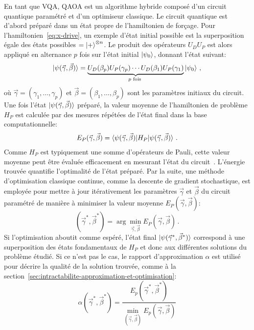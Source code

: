 En tant que VQA, QAOA est un algorithme hybride composé d'un circuit quantique paramétré et d'un optimiseur classique. Le circuit quantique est d'abord préparé dans un état propre de l'hamiltonien de forçage. Pour l'hamiltonien~\ref{eq:x-drive}, un exemple d'état initial possible est la superposition égale des états possibles $= \ket{+}^{\otimes n}$. Le produit des opérateurs $U_{D}U_{P}$ est alors appliqué en alternance $p$ fois sur l'état initial $\ket{\psi_{0}}$, donnant l'état suivant:
\begin{equation}
    \label{eq:final-state}
    \ket{\psi(\vec{\gamma}, \vec{\beta})} = \underbrace{U_D(\beta_p) U_P(\gamma_p) \cdots U_D(\beta_1) U_P(\gamma_1)}_{p \text{ fois }} \ket{\psi_{0}} \,,
\end{equation}
où $\vec{\gamma} = (\gamma_{1}, \dots, \gamma_{p})$ et $\vec{\beta} = (\beta_{1}, \dots, \beta_{p})$ sont les paramètres initiaux du circuit. Une fois l'état $\ket{\psi(\vec{\gamma}, \vec{\beta})}$ préparé, la valeur moyenne de l'hamiltonien de problème $H_{P}$ est calculée par des mesures répétées de l'état final dans la base computationnelle:
\begin{equation}
    E_{P} (\vec{\gamma}, \vec{\beta}) = \braket{ \psi(\vec{\gamma}, \vec{\beta}) | H_{P} | \psi(\vec{\gamma}, \vec{\beta}) } \,.
\end{equation}
Comme $H_{P}$ est typiquement une somme d'opérateurs de Pauli, cette valeur moyenne peut être évaluée efficacement en mesurant l'état du circuit~\cite{nielsenQuantumComputationQuantum2011}. L'énergie trouvée quantifie l'optimalité de l'état préparé. Par la suite, une méthode d'optimisation classique continue, comme la descente de gradient stochastique, est employée pour mettre à jour itérativement les paramètres $\vec{\gamma}$ et $\vec{\beta}$ du circuit paramétré de manière à minimiser la valeur moyenne $E_{P} (\vec{\gamma}, \vec{\beta})$:
\begin{equation}
    (\vec{\gamma}^{*}, \vec{\beta}^{*}) = \arg \min_{{\vec{\gamma}, \vec{\beta}}} E_{P}(\vec{\gamma}, \vec{\beta}) \,.
\end{equation}
Si l'optimisation aboutit comme espéré, l'état final $\ket{\psi(\vec{\gamma}^{*}, \vec{\beta}^{*})}$ correspond à une superposition des états fondamentaux de $H_{P}$ et donc aux différentes solutions du problème étudié. Si ce n'est pas le cas, le rapport d'approximation $\alpha$ est utilisé pour décrire la qualité de la solution trouvée, comme à la section~\ref{sec:intractabilite-approximation-et-optimisation}:
\begin{equation}
    \alpha (\vec{\gamma}^{*}, \vec{\beta}^{*}) = \frac{ E_{p} (\vec{\gamma}^{*}, \vec{\beta}^{*})}{\min_{(\vec{\gamma}, \vec{\beta})} E_{p} (\vec{\gamma}, \vec{\beta}) }
\end{equation}
